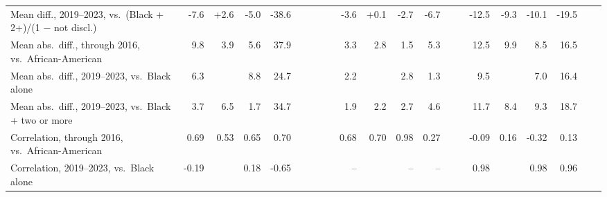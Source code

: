 \begin{table}[H]
{\begin{tabular}[t]{lrrrrrrrrrrrrrrrrrrrr}
\hspace{1em}Mean diff., 2019--2023, vs.\ (Black + 2+)/(1 $-$ not discl.) & -7.6 & +2.6 & -5.0 & -38.6 &  &  &  &  & -3.6 & +0.1 & -2.7 & -6.7 &  &  & -12.5 & -9.3 & -10.1 & -19.5 &  & \\
\hspace{1em}Mean abs.\ diff., through 2016, vs.\ African-American & 9.8 & 3.9 & 5.6 & 37.9 &  &  &  &  & 3.3 & 2.8 & 1.5 & 5.3 &  &  & 12.5 & 9.9 & 8.5 & 16.5 &  & \\
\hspace{1em}Mean abs.\ diff., 2019--2023, vs.\ Black alone & 6.3 &  & 8.8 & 24.7 &  &  &  &  & 2.2 &  & 2.8 & 1.3 &  &  & 9.5 &  & 7.0 & 16.4 &  & \\
\hspace{1em}Mean abs.\ diff., 2019--2023, vs.\ Black + two or more & 3.7 & 6.5 & 1.7 & 34.7 &  &  &  &  & 1.9 & 2.2 & 2.7 & 4.6 &  &  & 11.7 & 8.4 & 9.3 & 18.7 &  & \\
\hspace{1em}Correlation, through 2016, vs.\ African-American & 0.69 & 0.53 & 0.65 & 0.70 &  &  &  &  & 0.68 & 0.70 & 0.98 & 0.27 &  &  & -0.09 & 0.16 & -0.32 & 0.13 &  & \\
\hspace{1em}Correlation, 2019--2023, vs.\ Black alone & -0.19 &  & 0.18 & -0.65 &  &  &  &  & -- &  & -- & -- &  &  & 0.98 &  & 0.98 & 0.96 &  & \\
\bottomrule
\end{tabular}}
\end{table}

